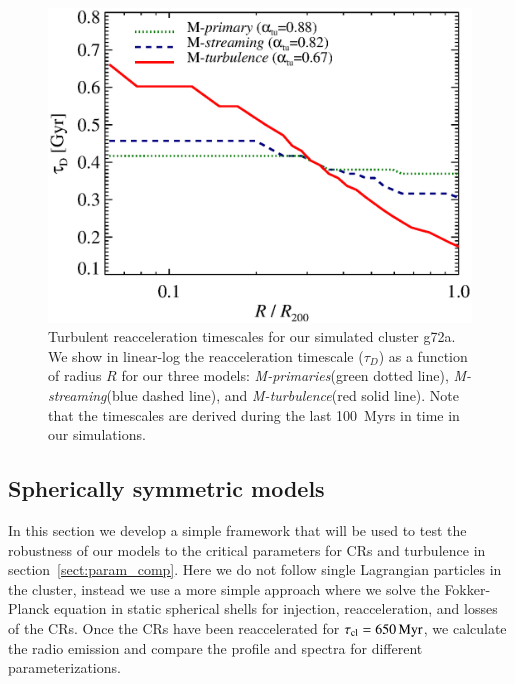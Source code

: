 \documentclass[fleqn,usenatbib,useAMS]{mnras}
\newcommand{\Mstream}{{\it M-streaming}\xspace}
\newcommand{\Mflatturb}{{\it M-turbulence}\xspace}
\newcommand{\Mprimary}{{\it M-primaries}\xspace}
\begin{document}
\begin{figure}
  \includegraphics[width=1.0\columnwidth]{tau_reacc.eps}
  \caption{Turbulent reacceleration timescales for our simulated
    cluster g72a. We show in linear-log the reacceleration timescale
    ($\tau_D$) as a function of radius $R$ for our three models:
    \Mprimary (green dotted line), \Mstream (blue dashed line), and
    \Mflatturb (red solid line). Note that the timescales are derived
    during the last 100~Myrs in time in our simulations.}
  \label{fig:tauD}
\end{figure}



\subsection{Spherically symmetric models}
In this section we develop a simple framework that will be used to
test the robustness of our models to the critical parameters for CRs
and turbulence in section~\ref{sect:param_comp}. Here we do not follow
single Lagrangian particles in the cluster, instead we use a more
simple approach where we solve the Fokker-Planck equation in static
spherical shells for injection, reacceleration, and losses of the
CRs. Once the CRs have been reaccelerated for $\tau_{\mathrm{cl}} =
650\,{\mathrm{Myr}}$, we calculate the radio emission and compare the
profile and spectra for different parameterizations.
\end{document}
